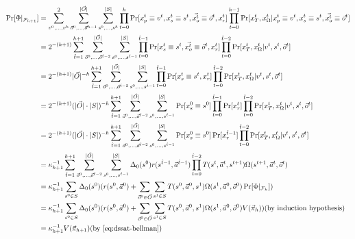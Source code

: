 \begin{tcolorbox}[colback=white]
    \scriptsize
    \begin{align*}
        \Pr[\Phi|_{\mathcal{F}_{h+1}}] & =\sum_{v^0,\ldots,v^h}^{2}\sum_{\vec{o}^0,\ldots,\vec{o}^{h-1}}^{|\vec{O}|}\sum_{s^0,\ldots,s^h}^{|S|}\prod_{t=0}^h\Pr[x_p^t \equiv v^t,x_s^t \equiv s^t,\vec{x_o^t} \equiv \vec{o}^t,x_r^t]\prod_{t=0}^{h-1}\Pr[x_T^t,x_\Omega^t|x_p^t \equiv v^t,x_s^t \equiv s^t,\vec{x_o^t}\equiv \vec{o}^t] \\
                                       & =2^{-(h+1)}\sum_{\hat{t}=1}^{h+1}\sum_{\vec{o}^0,\ldots,\vec{o}^{\hat{t}-2}}^{|\vec{O}|}\sum_{s^0,\ldots,s^{\hat{t}-1}}^{|S|}\prod_{t=0}^{\hat{t}-1}\Pr[x_s^t \equiv s^t,\vec{x_o^t}\equiv\vec{o}^t,x_r^t]\prod_{t=0}^{\hat{t}-2}\Pr[x_T^t,x_\Omega^t|v^t,s^t,\vec{o}^t]                         \\
                                       & =2^{-(h+1)}|\vec{O}|^{-h}\sum_{\hat{t}=1}^{h+1}\sum_{\vec{o}^0,\ldots,\vec{o}^{\hat{t}-2}}^{|\vec{O}|}\sum_{s^0,\ldots,s^{\hat{t}-1}}^{|S|}\prod_{t=0}^{\hat{t}-1}\Pr[x_s^t \equiv s^t,x_r^t]\prod_{t=0}^{\hat{t}-2}\Pr[x_T^t,x_\Omega^t|v^t,s^t,\vec{o}^t]                                      \\
                                       & =2^{-(h+1)}(|\vec{O}|\cdot|S|)^{-h}\sum_{\hat{t}=1}^{h+1}\sum_{\vec{o}^0,\ldots,\vec{o}^{\hat{t}-2}}^{|\vec{O}|}\sum_{s^0,\ldots,s^{\hat{t}-1}}^{|S|}\Pr[x_s^0 \equiv s^0]\prod_{t=0}^{\hat{t}-1}\Pr[x_r^t]\prod_{t=0}^{\hat{t}-2}\Pr[x_T^t,x_\Omega^t|v^t,s^t,\vec{o}^t]                        \\
                                       & =2^{-(h+1)}(|\vec{O}|\cdot|S|)^{-h}\sum_{\hat{t}=1}^{h+1}\sum_{\vec{o}^0,\ldots,\vec{o}^{\hat{t}-2}}^{|\vec{O}|}\sum_{s^0,\ldots,s^{\hat{t}-1}}^{|S|}\Pr[x_s^0 \equiv s^0]\Pr[x_r^{\hat{t}-1}]\prod_{t=0}^{\hat{t}-2}\Pr[x_T^t,x_\Omega^t|v^t,s^t,\vec{o}^t]                                     \\
                                       & =\kappa_{h+1}^{-1}\sum_{\hat{t}=1}^{h+1}\sum_{\vec{o}^0,\ldots,\vec{o}^{\hat{t}-2}}^{|\vec{O}|}\sum_{s^0,\ldots,s^{\hat{t}-1}}^{|S|}\Delta_0(s^0)r(s^{\hat{t}-1},\vec{a}^{\hat{t}-1})\prod_{t=0}^{\hat{t}-2}T(s^t,\vec{a}^t,s^{t+1})\Omega(s^{t+1},\vec{a}^t,\vec{o}^t)                          \\
                                       & =\kappa_{h+1}^{-1}\sum_{s^0\in S}\Delta_0(s^0)(r(s^0,\vec{a}^0)+\sum_{\vec{o}^0\in \vec{O}}\sum_{s^1\in S}T(s^0,\vec{a}^0,s^1)\Omega(s^1,\vec{a}^0,\vec{o}^0)\Pr[\Phi|_{\mathcal{F}_h}])                                                                                                         \\
                                       & =\kappa_{h+1}^{-1}\sum_{s^0\in S}\Delta_0(s^0)(r(s^0,\vec{a}^0)+\sum_{\vec{o}^0\in \vec{O}}\sum_{s^1\in S}T(s^0,\vec{a}^0,s^1)\Omega(s^1,\vec{a}^0,\vec{o}^0)V(\vec{\pi}_h))\text{(by induction hypothesis)}                                                                                     \\
                                       & =\kappa_{h+1}^{-1} V(\vec{\pi}_{h+1})\text{(by~\cref{eq:dssat-bellman})}
    \end{align*}
\end{tcolorbox}